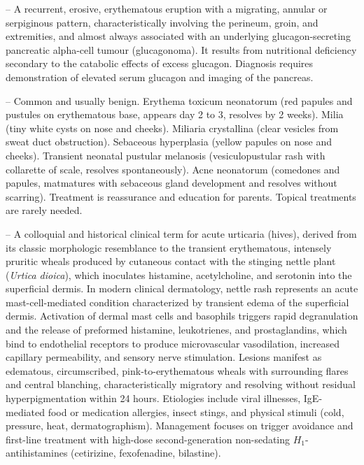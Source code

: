 -- A recurrent, erosive, erythematous eruption with a migrating, annular or serpiginous pattern, characteristically involving the perineum, groin, and extremities, and almost always associated with an underlying glucagon-secreting pancreatic alpha-cell tumour (glucagonoma). It results from nutritional deficiency secondary to the catabolic effects of excess glucagon. Diagnosis requires demonstration of elevated serum glucagon and imaging of the pancreas.

-- Common and usually benign. Erythema toxicum neonatorum (red papules and pustules on erythematous base, appears day 2 to 3, resolves by 2 weeks). Milia (tiny white cysts on nose and cheeks). Miliaria crystallina (clear vesicles from sweat duct obstruction). Sebaceous hyperplasia (yellow papules on nose and cheeks). Transient neonatal pustular melanosis (vesiculopustular rash with collarette of scale, resolves spontaneously). Acne neonatorum (comedones and papules, matmatures with sebaceous gland development and resolves without scarring). Treatment is reassurance and education for parents. Topical treatments are rarely needed.

-- A colloquial and historical clinical term for acute urticaria (hives), derived from its classic morphologic resemblance to the transient erythematous, intensely pruritic wheals produced by cutaneous contact with the stinging nettle plant (\textit{Urtica dioica}), which inoculates histamine, acetylcholine, and serotonin into the superficial dermis. In modern clinical dermatology, nettle rash represents an acute mast-cell-mediated condition characterized by transient edema of the superficial dermis. Activation of dermal mast cells and basophils triggers rapid degranulation and the release of preformed histamine, leukotrienes, and prostaglandins, which bind to endothelial receptors to produce microvascular vasodilation, increased capillary permeability, and sensory nerve stimulation. Lesions manifest as edematous, circumscribed, pink-to-erythematous wheals with surrounding flares and central blanching, characteristically migratory and resolving without residual hyperpigmentation within 24 hours. Etiologies include viral illnesses, IgE-mediated food or medication allergies, insect stings, and physical stimuli (cold, pressure, heat, dermatographism). Management focuses on trigger avoidance and first-line treatment with high-dose second-generation non-sedating $H_1$-antihistamines (cetirizine, fexofenadine, bilastine).

